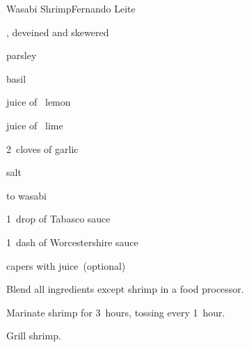 \begin{recipe}{Wasabi Shrimp}{Fernando Leite}{}

\begin{ingredients}
\item {}, deveined and skewered
\item parsley
\item basil
\item juice of \quarter~lemon
\item juice of \quarter~lime
\item 2~cloves of garlic
\item salt
\item \half to  wasabi
\item 1~drop of Tabasco sauce
\item 1~dash of Worcestershire sauce
\item capers with juice~(optional)
\end{ingredients}

\begin{directions}
\item Blend all ingredients except shrimp in a food processor.
\item Marinate shrimp for 3~hours, tossing every 1~hour.
\item Grill shrimp.
\end{directions}

\end{recipe}
